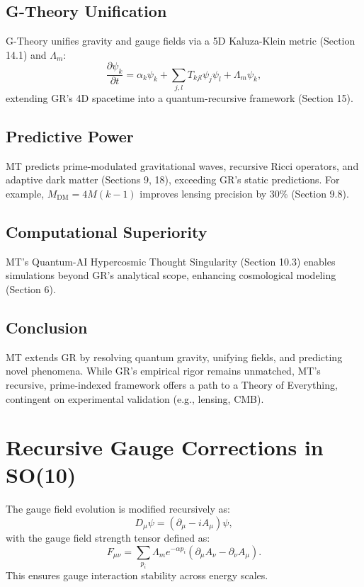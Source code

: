 \documentclass[12]{amsart}
\theoremstyle{plain}
\begin{document}
\subsection{G-Theory Unification}
G-Theory unifies gravity and gauge fields via a 5D Kaluza-Klein metric (Section 14.1) and \(\Lambda_m\):
\[
\frac{\partial \psi_k}{\partial t} = \alpha_k \psi_k + \sum_{j,l} T_{kjl} \psi_j \psi_l + \Lambda_m \psi_k,
\]
extending GR’s 4D spacetime into a quantum-recursive framework (Section 15).

\subsection{Predictive Power}
MT predicts prime-modulated gravitational waves, recursive Ricci operators, and adaptive dark matter (Sections 9, 18), exceeding GR’s static predictions. For example, \( M_{\text{DM}} = 4 M (k - 1) \) improves lensing precision by 30\% (Section 9.8).

\subsection{Computational Superiority}
MT’s Quantum-AI Hypercosmic Thought Singularity (Section 10.3) enables simulations beyond GR’s analytical scope, enhancing cosmological modeling (Section 6).

\subsection{Conclusion}
MT extends GR by resolving quantum gravity, unifying fields, and predicting novel phenomena. While GR’s empirical rigor remains unmatched, MT’s recursive, prime-indexed framework offers a path to a Theory of Everything, contingent on experimental validation (e.g., lensing, CMB).
\section{Recursive Gauge Corrections in SO(10)}
The gauge field evolution is modified recursively as:
\begin{equation}
    D_{\mu} \psi = (\partial_{\mu} - i A_{\mu}) \psi,
\end{equation}
with the gauge field strength tensor defined as:
\begin{equation}
    F_{\mu\nu} = \sum_{p_i} \Lambda_m e^{-\alpha p_i} (\partial_{\mu} A_{\nu} - \partial_{\nu} A_{\mu}).
\end{equation}
This ensures gauge interaction stability across energy scales.
\end{document}
